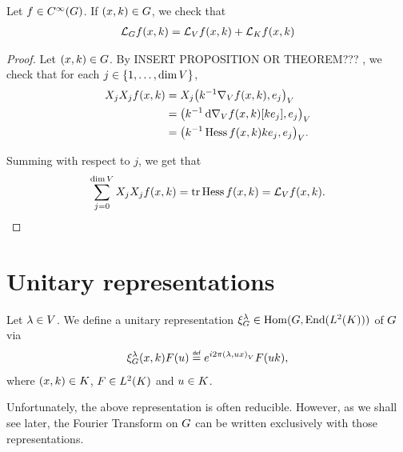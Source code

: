 \begin{proposition}
    Let $f \in \SmoothFunctions\Group$.
    If $(x, k) \in \Group$, we check that
    \begin{align*}
        \Laplacian f(x, k) = \Laplacian[\VectorSpace] f(x, k) + \Laplacian[\CompactGroup] f(x, k)
    \end{align*}
\end{proposition}
\begin{proof}
    Let $(x, k) \in \Group$.
    By INSERT PROPOSITION OR THEOREM??? ,
    we check that for each $j \in \{1, \dots, \dim \VectorSpace\}$,
    \begin{align*}
        \LeftDifferentialOperatorFirstOrder{X_j} \LeftDifferentialOperatorFirstOrder{X_j} f(x, k)
        &= \LeftDifferentialOperatorFirstOrder{X_j} \ip{k^{-1} \grad f(x, k)}{e_j}\\
        &= \ip{k^{-1} \dd \grad f(x, k)[k e_j]}{e_j}\\
        &= \ip{k^{-1} \Hessian f(x, k) k e_j}{e_j}.
    \end{align*}

    Summing with respect to $j$, we get that
    \begin{align*}
        \sum_{j = 0}^{\dim \VectorSpace} \LeftDifferentialOperatorFirstOrder{X_j} \LeftDifferentialOperatorFirstOrder{X_j} f(x, k)
        = \tr \Hessian f(x, k) = \Laplacian[\VectorSpace] f(x, k).
    \end{align*}
\end{proof}

\section{Unitary representations}

\begin{definition}
\label{definition:reducible_representation}
    Let $\lambda \in \VectorSpace$.
    We define a unitary representation $\Rep{\lambda} \in \Hom(\Group, \End(\Lebesgue{2}{\CompactGroup}))$ of $\Group$ via
    \begin{align}
        \Rep{\lambda} (x, k) F(u) \defeq \e^{\i \turn \ip \lambda {u x}} F(u k),
        \label{eq:reducible_representations_on_the_motion_groups}
    \end{align}
    where $(x, k) \in \CompactGroup$, $F \in \Lebesgue{2}{\CompactGroup}$ and $u \in \CompactGroup$.
\end{definition}

Unfortunately, the above representation is often reducible.
However, as we shall see later, the Fourier Transform on $\Group$ can be written exclusively with those representations.

